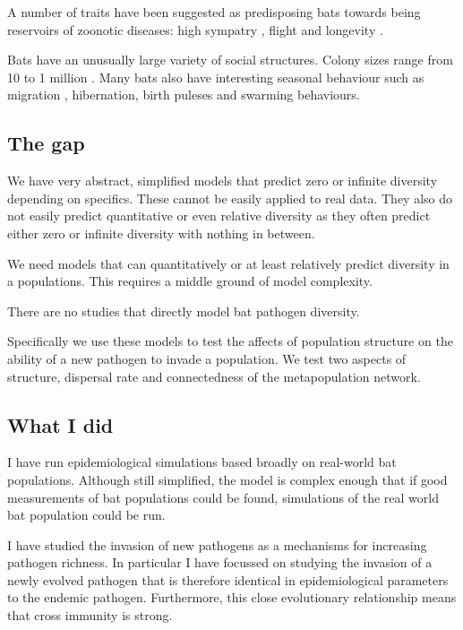 A number of traits have been suggested as predisposing bats towards being reservoirs of zoonotic diseases: high sympatry \cite{luis2013comparison}, flight \cite{wang2011mass} and longevity \cite{wang2011mass}.

Bats have an unusually large variety of social structures.
Colony sizes range from 10 to 1 million \cite{jones2009pantheria}.
Many bats also have interesting seasonal behaviour such as migration \cite{richter2008first, fleming2003ecology}, hibernation, birth puleses and swarming behaviours.


\subsection{The gap}

We have very abstract, simplified models that predict zero or infinite diversity depending on specifics.
These cannot be easily applied to real data.
They also do not easily predict quantitative or even relative diversity as they often predict either zero or infinite diversity with nothing in between.

We need models that can quantitatively or at least relatively predict diversity in a populations.
This requires a middle ground of model complexity.

There are no studies that directly model bat pathogen diversity.

Specifically we use these models to test the affects of population structure on the ability of a new pathogen to invade a population.
We test two aspects of structure, dispersal rate and connectedness of the metapopulation network.


\subsection{What I did}


I have run epidemiological simulations based broadly on real-world bat populations.
Although still simplified, the model is complex enough that if good measurements of bat populations could be found, simulations of the real world bat population could be run.

I have studied the invasion of new pathogens as a mechanisms for increasing pathogen richness.
In particular I have focussed on studying the invasion of a newly evolved pathogen that is therefore identical in epidemiological parameters to the endemic pathogen.
Furthermore, this close evolutionary relationship means that cross immunity is strong.

